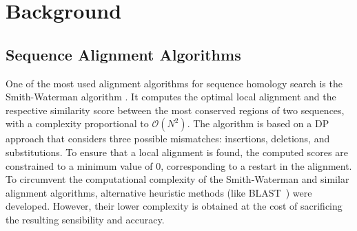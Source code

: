 \documentclass{bmcart}
\begin{document}




\section*{Background}

\subsection*{Sequence Alignment Algorithms}

One of the most used alignment algorithms for sequence homology search is the Smith-Waterman algorithm \cite{smithwaterman}. It computes the optimal local alignment and the respective similarity score between the most conserved regions of two sequences, with a complexity proportional to $\mathcal{O}(N^2)$. The algorithm is based on a \ac{DP} approach that considers three possible mismatches: insertions, deletions, and substitutions. To ensure that a local alignment is found, the computed scores are constrained to a minimum value of 0, corresponding to a restart in the alignment. To circumvent the computational complexity of the Smith-Waterman and similar alignment algorithms, alternative heuristic methods (like BLAST~\cite{blast}) were developed. However, their lower complexity is obtained at the cost of sacrificing the resulting sensibility and accuracy.
\end{document}
